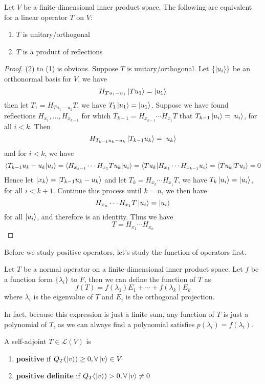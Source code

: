 \documentclass{article}
\begin{document}
\begin{thm}
	Let $V$ be a finite-dimensional inner product space. The following are equivalent for a linear operator $T$ on $V$:
	\begin{enumerate}
		\item $T$ is unitary/orthogonal
		\item $T$ is a product of reflections
	\end{enumerate}
\end{thm}
\begin{proof}
	(2) to (1) is obvious. Suppose $T$ is unitary/orthogonal. Let $\{\ket{u_i}\}$ be an orthonormal basis for $V$, we have
	\[H_{Tu_1-u_1}\ket{Tu_1}=\ket{u_1}\]
	then let $T_1=H_{Tu_1-u_1}T$, we have $T_1\ket{u_1}=\ket{u_1}$. Suppose we have found reflections $H_{x_1},\dots,H_{x_{k-1}}$ for which $T_{k-1}=H_{x_{k-1}}\cdots H_{x_{1}}T$ that $T_{k-1}\ket{u_{i}}=\ket{u_{i}}$, for all $i<k$. Then
	\[H_{T_{k-1}u_k-u_k}\ket{T_{k-1}u_k}=\ket{u_k}\]
	and for $i<k$, we have
	\[\braket{T_{k-1}u_k-u_k|u_i}=\braket{H_{x_{k-1}}\cdots H_{x_{1}}Tu_k|u_i}=\braket{Tu_k|H_{x_{1}}\cdots H_{x_{k-1}}u_i}=\braket{Tu_k|Tu_i}=0\] 
	Hence let $\ket{x_k}=\ket{T_{k-1}u_k-u_k}$ and let $T_k=H_{x_k}\cdots H_{x_1}T$, we have $T_k\ket{u_i}=\ket{u_i}$, for all $i<k+1$. Continue this process until $k=n$, we then have
	\[H_{x_n}\cdots H_{x_1}T\ket{u_i}=\ket{u_i}\]
	for all $\ket{u_i}$, and therefore is an identity. Thus we have
	\[T=H_{x_1}\cdots H_{x_n}\]
\end{proof}
Before we study positive operators, let's study the function of operators first.
\begin{dde}
	Let $T$ be a normal operator on a finite-dimensional inner product space. Let $f$ be a function form $\{\lambda_i\}$ to $F$, then we can define the function of $T$ as
	\[f(T)=f(\lambda_1)E_1+\cdots+f(\lambda_k)E_k\]
	where $\lambda_i$ is the eigenvalue of $T$ and $E_i$ is the orthogonal projection.
\end{dde}
In fact, because this expression is just a finite sum, any function of $T$ is just a polynomial of $T$, as we can always find a polynomial satisfies $p(\lambda_i)=f(\lambda_i)$.
\begin{dde}
	A self-adjoint $T\in\mathcal{L}(V)$ is
	\begin{enumerate}
		\item \textbf{positive} if $Q_T(\ket{v})\ge0,\forall\ket{v}\in V$
		\item \textbf{positive definite} if $Q_T(\ket{v})>0,\forall\ket{v}\neq0$
	\end{enumerate}
\end{dde}
\end{document}
